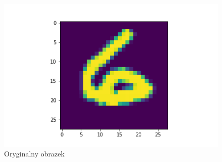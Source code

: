 \documentclass[11pt, a4paper]{article}
\begin{document}
\begin{enumerate}
\begin{figure}[H]
  \centering
  \includegraphics[scale=0.6]{original.png}
  \caption{Oryginalny obrazek}
\end{figure}


\end{enumerate}
\end{document}
